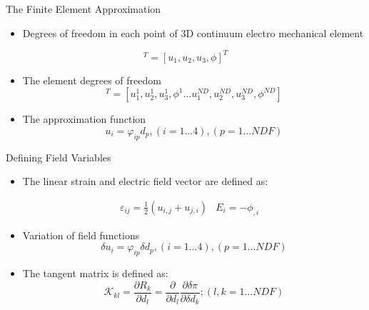 \documentclass{beamer}
\begin{document}
\begin{frame}{The Finite Element Approximation}
  \begin{itemize}
  \item Degrees of freedom in each point of 3D continuum electro mechanical element
\end{itemize}

\begin{equation}
[u]^T=[u_1,u_2,u_3,\phi]^T
\label{EQN:displacement}
\end{equation}

\begin{itemize}
\item The element degrees of freedom\
\begin{equation}
[d]^T=[u_1^1,u_2^1,u_3^1,\phi^1 \dots u_1^{ND},u_2^{ND},u_3^{ND},\phi^{ND}]
\label{EQN:degreesoffreedom}
\end{equation}
\end{itemize}

\begin{itemize}
\item The approximation function\
\begin{equation}
u_i=\varphi_{ip} d_p,(i=1\dots 4),(p=1\dots NDF)
\label{EQN:DispShapeDof}
\end{equation}
\end{itemize}
\end{frame}

\begin{frame}{Defining Field Variables}
  \begin{itemize}
  \item The linear strain and electric field vector are defined as:
\end{itemize}

\begin{equation}
\begin{aligned}
&\varepsilon_{ij}=\frac{1}{2}(u_{i,j}+u_{j,i})
&E_{i}=-\phi_{,i}
\end{aligned}
\label{EQN:Linearstrain_Electri}
\end{equation}

\begin{itemize}
\item Variation of field functions\
\begin{equation}
\delta u_i=\varphi_{ip} \delta d_p,(i=1\dots 4),(p=1\dots NDF)
\label{EQN:VarDispShapeDof}
\end{equation}
\end{itemize}

\begin{itemize}
\item The tangent matrix is defined as:\
\begin{equation}
\mathcal{K}_{kl} =\frac{\partial R_k}{\partial d_l}=\frac{\partial}{\partial d_l} \frac{\partial \delta \pi}{\partial \delta d_k} ; (l,k=1\dots NDF)
\label{EQN:TangentRepresentation}
\end{equation}
\end{itemize}
\end{frame}
\end{document}
